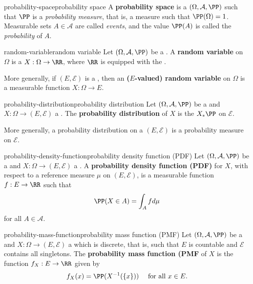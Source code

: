 \begin{topic}{probability-space}{probability space}
    A \textbf{probability space} is a  $(\Omega, \mathcal{A}, \PP)$ such that $\PP$ is a \textit{probability measure}, that is, a measure such that $\PP(\Omega) = 1$. Measurable sets $A \in \mathcal{A}$ are called \textit{events}, and the value $\PP(A)$ is called the \textit{probability} of $A$.
\end{topic}

\begin{topic}{random-variable}{random variable}
    Let $(\Omega, \mathcal{A}, \PP)$ be a . A \textbf{random variable} on $\Omega$ is a  $X : \Omega \to \RR$, where $\RR$ is equipped with the .
    
    More generally, if $(E, \mathcal{E})$ is a , then an \textbf{($E$-valued) random variable} on $\Omega$ is a measurable function $X : \Omega \to E$.
\end{topic}

\begin{topic}{probability-distribution}{probability distribution}
    Let $(\Omega, \mathcal{A}, \PP)$ be a  and $X : \Omega \to (E, \mathcal{E})$ a . The \textbf{probability distribution} of $X$ is the  $X_* \PP$ on $\mathcal{E}$.

    More generally, a probability distribution on a  $(E, \mathcal{E})$ is a probability measure on $\mathcal{E}$.
\end{topic}

\begin{topic}{probability-density-function}{probability density function (PDF)}
    Let $(\Omega, \mathcal{A}, \PP)$ be a  and $X : \Omega \to (E, \mathcal{E})$ a . A \textbf{probability density function (PDF)} for $X$, with respect to a reference measure $\mu$ on $(E, \mathcal{E})$, is a measurable function $f : E \to \RR$ such that
    \[ \PP(X \in A) = \int_A f d \mu \]
    for all $A \in \mathcal{A}$.
\end{topic}

\begin{topic}{probability-mass-function}{probability mass function (PMF)}
    Let $(\Omega, \mathcal{A}, \PP)$ be a  and $X : \Omega \to (E, \mathcal{E})$ a  which is discrete, that is, such that $E$ is countable and $\mathcal{E}$ contains all singletons. The \textbf{probability mass function (PMF} of $X$ is the function $f_X : E \to \RR$ given by
    \[ f_X(x) = \PP(X^{-1}(\{ x \})) \quad \textup{ for all } x \in E . \]
    
\end{topic}


